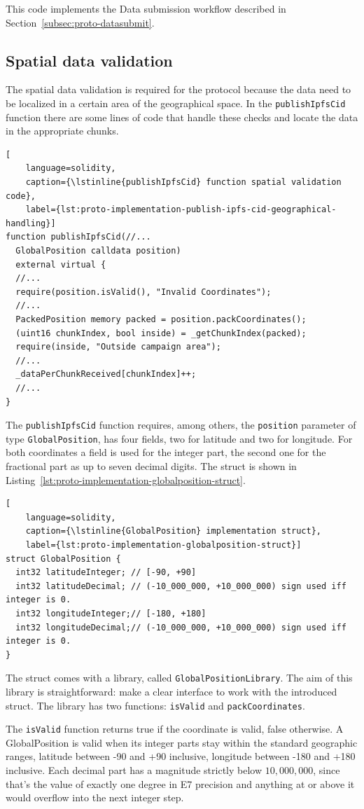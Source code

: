 This code implements the Data submission workflow described in Section~\ref{subsec:proto-datasubmit}.

\subsection{Spatial data validation}\label{subsec:implementation-spatial-data-validation}
The spatial data validation is required for the protocol because the data need to be localized in a certain area of the geographical space.
In the \lstinline{publishIpfsCid} function there are some lines of code that handle these checks and locate the data in the appropriate chunks.
\begin{lstlisting}[
    language=solidity,
    caption={\lstinline{publishIpfsCid} function spatial validation code},
    label={lst:proto-implementation-publish-ipfs-cid-geographical-handling}]
function publishIpfsCid(//...
  GlobalPosition calldata position)
  external virtual {
  //...
  require(position.isValid(), "Invalid Coordinates");
  //...
  PackedPosition memory packed = position.packCoordinates();
  (uint16 chunkIndex, bool inside) = _getChunkIndex(packed);
  require(inside, "Outside campaign area");
  //...
  _dataPerChunkReceived[chunkIndex]++;
  //...
}
\end{lstlisting}
The \lstinline{publishIpfsCid} function requires, among others, the \lstinline{position} parameter of type \lstinline{GlobalPosition}, has four fields, two for latitude and two for longitude.
For both coordinates a field is used for the integer part, the second one for the fractional part as up to seven decimal digits.
The struct is shown in Listing~\ref{lst:proto-implementation-globalposition-struct}.
\begin{lstlisting}[
    language=solidity,
    caption={\lstinline{GlobalPosition} implementation struct},
    label={lst:proto-implementation-globalposition-struct}]
struct GlobalPosition {
  int32 latitudeInteger; // [-90, +90]
  int32 latitudeDecimal; // (-10_000_000, +10_000_000) sign used iff integer is 0.
  int32 longitudeInteger;// [-180, +180]
  int32 longitudeDecimal;// (-10_000_000, +10_000_000) sign used iff integer is 0.
}
\end{lstlisting}
The struct comes with a library, called \lstinline{GlobalPositionLibrary}.
The aim of this library is straightforward: make a clear interface to work with the introduced struct.
The library has two functions: \lstinline{isValid} and \lstinline{packCoordinates}.

The \lstinline{isValid} function returns true if the coordinate is valid, false otherwise.
A GlobalPosition is valid when its integer parts stay within the standard geographic ranges, latitude between -90 and +90 inclusive, longitude between -180 and +180 inclusive.
Each decimal part has a magnitude strictly below $10,000,000$, since that's the value of exactly one degree in E7 precision and anything at or above it would overflow into the next integer step.

